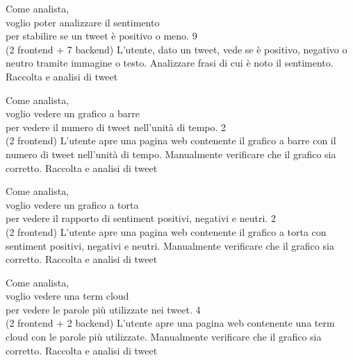 \userstory%
{Come analista,\\voglio poter analizzare il sentimento\\per stabilire se un tweet è positivo o meno.}%
{9\\(2 frontend + 7 backend)}%
{L'utente, dato un tweet, vede se è positivo, negativo o neutro tramite immagine o testo.}%
{Analizzare frasi di cui è noto il sentimento.}
{Raccolta e analisi di tweet}

\userstory%
{Come analista,\\voglio vedere un grafico a barre\\per vedere il numero di tweet nell'unità di tempo.}%
{2\\(2 frontend)}%
{L'utente apre una pagina web contenente il grafico a barre con il numero di tweet nell'unità di tempo.}%
{Manualmente verificare che il grafico sia corretto.}
{Raccolta e analisi di tweet}

\userstory%
{Come analista,\\voglio vedere un grafico a torta\\per vedere il rapporto di sentiment positivi, negativi e neutri.}%
{2\\(2 frontend)}%
{L'utente apre una pagina web contenente il grafico a torta con sentiment positivi, negativi e neutri.}%
{Manualmente verificare che il grafico sia corretto.}
{Raccolta e analisi di tweet}

\userstory%
{Come analista,\\voglio vedere una term cloud\\per vedere le parole più utilizzate nei tweet.}%
{4\\(2 frontend + 2 backend)}%
{L'utente apre una pagina web contenente una term cloud con le parole più utilizzate.}%
{Manualmente verificare che il grafico sia corretto.}
{Raccolta e analisi di tweet}

\newpage
